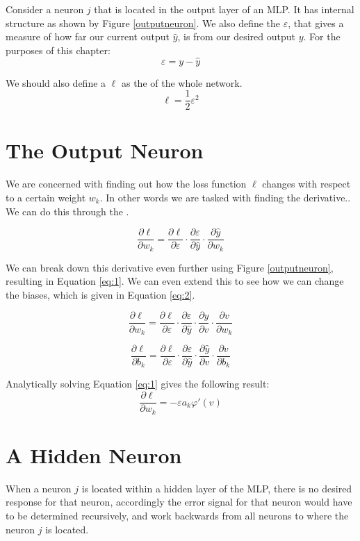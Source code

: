 Consider a neuron $j$ that is located in the output layer of an MLP. It has internal structure as shown by Figure \ref{outputneuron}. We also define the  $\varepsilon$, that gives a measure of how far our current output $\hat{y}$, is from our desired output $y$. For the purposes of this chapter:
\[  \varepsilon =  y - \hat{y}\]

We should also define a  $\ell$ as the  of the whole network.
\[  \ell  = \frac{1}{2}\varepsilon^2 \]	

\section{The Output Neuron}

We are concerned with finding out how the loss function $\ell$ changes with respect to a certain weight $w_k$. In other words we are tasked with finding the derivative.. We can do this through the .

\[	\frac{\partial\ell}{\partial w_k} = \frac{\partial \ell}{\partial \varepsilon}\cdot\frac{\partial\varepsilon}{\partial\hat{y}}\cdot\frac{\partial\hat{y}}{\partial w_k}\]

We can break down this derivative even further using Figure \ref{outputneuron}, resulting in Equation \ref{eq:1}. We can even extend this to see how we can change the biases, which is given in Equation \ref{eq:2}.

\begin{equation}
	\label{eq:1}
	\frac{\partial\ell}{\partial w_k} = \frac{\partial \ell}{\partial \varepsilon}\cdot\frac{\partial\varepsilon}{\partial\hat{y}}\cdot\frac{\partial\hat{y}}{\partial v}\cdot\frac{\partial v}{\partial w_k}
\end{equation}

\begin{equation}
	\label{eq:2}
	\frac{\partial\ell}{\partial b_k} = \frac{\partial \ell}{\partial \varepsilon}\cdot\frac{\partial\varepsilon}{\partial\hat{y}}\cdot\frac{\partial\hat{y}}{\partial v}\cdot\frac{\partial v}{\partial b_k}
\end{equation}

Analytically solving Equation \ref{eq:1} gives the following result:
	\[ \frac{\partial\ell}{\partial w_k} = -\varepsilon a_k \varphi'(v)	\]
	
\section{A Hidden Neuron}

When a neuron $j$ is located within a hidden layer of the MLP, there is no desired response for that neuron, accordingly the error signal for that neuron would have to be determined recursively, and work backwards from all neurons to where the neuron $j$ is located.

